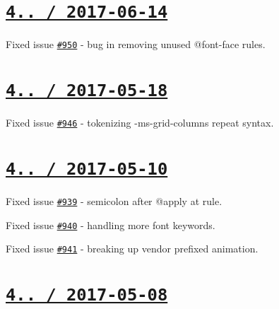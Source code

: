 \section*{\href{https://github.com/jakubpawlowicz/clean-css/compare/v4.1.3...v4.1.4}{\tt 4.. / 2017-\/06-\/14} }


\begin{DoxyItemize}
\item Fixed issue \href{https://github.com/jakubpawlowicz/clean-css/issues/950}{\tt \#950} -\/ bug in removing unused {\ttfamily @font-\/face} rules.
\end{DoxyItemize}

\section*{\href{https://github.com/jakubpawlowicz/clean-css/compare/v4.1.2...v4.1.3}{\tt 4.. / 2017-\/05-\/18} }


\begin{DoxyItemize}
\item Fixed issue \href{https://github.com/jakubpawlowicz/clean-css/issues/946}{\tt \#946} -\/ tokenizing {\ttfamily -\/ms-\/grid-\/columns} repeat syntax.
\end{DoxyItemize}

\section*{\href{https://github.com/jakubpawlowicz/clean-css/compare/v4.1.1...v4.1.2}{\tt 4.. / 2017-\/05-\/10} }


\begin{DoxyItemize}
\item Fixed issue \href{https://github.com/jakubpawlowicz/clean-css/issues/939}{\tt \#939} -\/ semicolon after {\ttfamily @apply} at rule.
\item Fixed issue \href{https://github.com/jakubpawlowicz/clean-css/issues/940}{\tt \#940} -\/ handling more {\ttfamily font} keywords.
\item Fixed issue \href{https://github.com/jakubpawlowicz/clean-css/issues/941}{\tt \#941} -\/ breaking up vendor prefixed {\ttfamily animation}.
\end{DoxyItemize}

\section*{\href{https://github.com/jakubpawlowicz/clean-css/compare/v4.1.0...v4.1.1}{\tt 4.. / 2017-\/05-\/08} }



